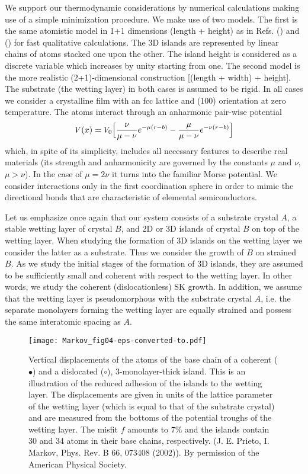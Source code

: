 \documentclass[aps,prl,showpacs,twocolumn,byrevtex,floatfix]{revtex4-1}
\begin{document}
We support our thermodynamic considerations by numerical calculations making
use of a simple minimization procedure. We make use of two models. The first
is the same atomistic model in 1+1 dimensions (length + height) as in Refs.
() and () for fast qualitative
calculations. The 3D islands are represented by linear chains of atoms stacked
one upon the other. The island height is considered as a discrete variable
which increases by unity starting from one. The second model is the more
realistic (2+1)-dimensional construction [(length + width) + height]. The
substrate (the wetting layer) in both cases is assumed to be rigid. In all cases
we consider a crystalline film with an fcc lattice and (100) orientation 
at zero temperature. The atoms interact through an anharmonic pair-wise
potential\cite{Markov93}
\begin{equation}\label{potential}
V(x) = V_0 \Bigl[\frac{\nu}{\mu - \nu}e^{-\mu (r-b)} - \frac{\mu}{\mu -
\nu}e^{-\nu (r-b)}\Bigr]
\end{equation}
which, in spite of its simplicity, includes all necessary features to describe
real materials (its strength and anharmonicity are governed by the constants
$\mu$ and $\nu$, $\mu > \nu$). In the case of $\mu = 2\nu$ it turns into the
familiar Morse potential. We consider interactions only in the first
coordination sphere in order to mimic the directional bonds that are
characteristic of elemental semiconductors.\cite{Tersoff86}

Let us emphasize once again that our system consists of a substrate crystal $A$,
a stable wetting layer of crystal $B$, and 2D or 3D islands of crystal $B$ on
top of the wetting layer. When studying the formation of 3D islands on the
wetting layer we consider the latter as a substrate. Thus we consider the growth
of $B$ on strained $B$. As we study the initial stages of the formation of 3D
islands, they are assumed to be sufficiently small and coherent with respect 
to the wetting layer. 
In other words, we study the coherent (dislocationless) SK growth. In
addition, we assume that the wetting layer is pseudomorphous with the substrate
crystal $A$, i.e. the separate monolayers forming the wetting layer are equally
strained and possess the same interatomic spacing as $A$.

\begin{figure}[htb]
\texttt{[image: Markov\_fig04-eps-converted-to.pdf]}
\caption{\label{verticals} Vertical displacements of the atoms of the base chain
of a coherent ($\bullet$) and a dislocated ($\circ$), 3-monolayer-thick island.
This is an illustration of the reduced adhesion of the islands to the wetting
layer. The displacements are given in units of the lattice parameter of the
wetting layer (which is equal to that of the substrate crystal) and are measured
from the bottoms of the potential troughs of the wetting layer. The misfit $f$
amounts to 7\% and the islands contain 30 and 34 atoms in their base chains,
respectively. (J. E. Prieto, I. Markov, Phys. Rev. B 66, 073408 (2002)).
By permission of the American Physical Society.}
\end{figure}
\end{document}
